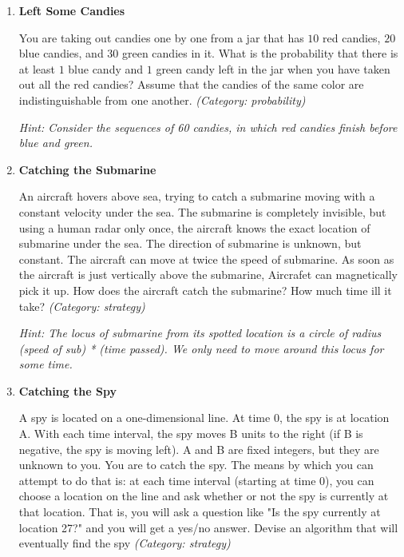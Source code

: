 \begin{enumerate}
\item \textbf{Left Some Candies}

You are taking out candies one by one from a jar that has $10$ red candies, $20$ blue candies, and $30$ green candies in it. What is the probability that there is at least $1$ blue candy and $1$ green candy left in the jar when you have taken out all the red candies?
Assume that the candies of the same color are indistinguishable from one another.
\small\emph{(Category: probability)}

\small\emph{Hint: Consider the sequences of 60 candies, in which red candies finish before blue and green.}





\item \textbf{Catching the Submarine}

An aircraft hovers above sea, trying to catch a submarine moving with a constant velocity under the sea. The submarine is completely invisible, but using a human radar only once, the aircraft knows the exact location of submarine under the sea. The direction of submarine is unknown, but constant. The aircraft can move at twice the speed of submarine. As soon as the aircraft is just vertically above the submarine, Aircrafet can magnetically pick it up. How does the aircraft catch the submarine? How much time ill it take?
\small\emph{(Category: strategy)}

\small\emph{Hint: The locus of submarine from its spotted location is a circle of radius (speed of sub) * (time passed). We only need to move around this locus for some time.}





\item \textbf{Catching the Spy}

A spy is located on a one-dimensional line.  At time 0, the spy is at location A.  With each time interval, the spy moves B units to the right (if B is negative, the spy is moving left).  A and B are fixed integers, but they are unknown to you.  You are to catch the spy.  The means by which you can attempt to do that is:  at each time interval (starting at time 0), you can choose a location on the line and ask whether or not the spy is currently at that location.  That is, you will ask a question like "Is the spy currently at location 27?" and you will get a yes/no answer.  Devise an algorithm that will eventually find the spy
\small\emph{(Category: strategy)}




\end{enumerate}
